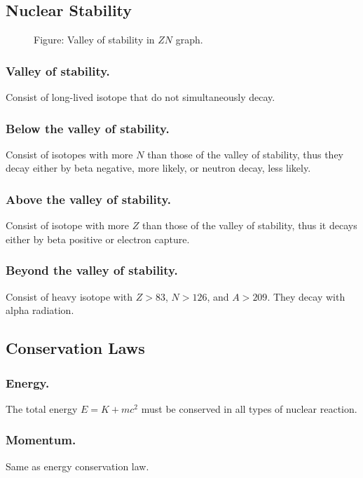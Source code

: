 \documentclass[../../../main.tex]{subfiles}
\begin{document}
\subsection*{Nuclear Stability}
\begin{figure*}[h]
    \centering
    \caption*{Figure: Valley of stability in $ZN$ graph.}
\end{figure*}

\subsubsection*{Valley of stability.}  Consist of long-lived isotope that do not simultaneously decay.

\subsubsection*{Below the valley of stability.} Consist of isotopes with more $N$ than those of the valley of stability, thus they decay either by beta negative, more likely, or neutron decay, less likely.

\subsubsection*{Above the valley of stability.} Consist of isotope with more $Z$ than those of the valley of stability, thus it decays either by beta positive or electron capture.

\subsubsection*{Beyond the valley of stability.}  Consist of heavy isotope with $Z>83$, $N>126$, and $A>209$. They decay with alpha radiation.

\subsection*{Conservation Laws}
\subsubsection*{Energy.} The total energy $E=K+mc^2$ must be conserved in all types of nuclear reaction.

\subsubsection*{Momentum.} Same as energy conservation law.
\end{document}
